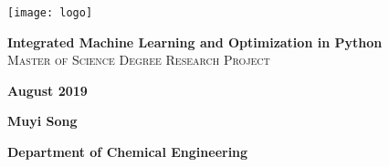 \begin{titlepage}
\vbox{ }

\begin{center}
\texttt{[image: logo]}\\[2cm]
\end{center}
\begin{center}

\vbox{ }
{ \LARGE \textbf {Integrated Machine Learning\vspace{7.5pt}  and Optimization in Python\vspace{7.5pt}}}\\[1.5cm]

\scshape{\large Master of Science Degree Research Project}\\[0.7cm]


\begin{center}\bfseries \large{August 2019}
\end{center}



\vbox{ }
\begin{center} \bfseries{Muyi Song}
\end{center}
{\bfseries Department of Chemical Engineering}
\end{center}
\end{titlepage}